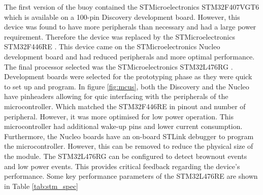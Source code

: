 The first version of the buoy contained the STMicroelectronics STM32F407VGT6 \cite{stmdisc} which is available on a 100-pin Discovery development board. However, this device was found to have more peripherals than necessary and had a large power requirement. Therefore the device was replaced by the STMicroelectronics STM32F446RE \cite{stm32nucleo}. This device came on the STMicroelectronics Nucleo development board and had reduced peripherals and more optimal performance. The final processor selected was the STMicroelectronics STM32L476RG \cite{stm32l4}. Development boards were selected for the prototyping phase as they were quick to set up and program. In figure \ref{fig:mcus}, both the Discovery and the Nucleo have pinheaders allowing for quic interfacing with the peripherals of the microcontroller. Which matched the STM32F446RE in pinout and number of peripheral. However, it was more optimised for low power operation. This microcontroller had additional wake-up pins and lower current consumption. Furthermore, the Nucleo boards have an on-board STLink debugger to program the microcontroller. However, this can be removed to reduce the physical size of the module. The STM32L476RG can be configured to detect brownout events and low power events. This provides critical feedback regarding the device's performance. Some key performance parameters of the STM32L476RE are shown in Table \ref{tab:stm_spec}

